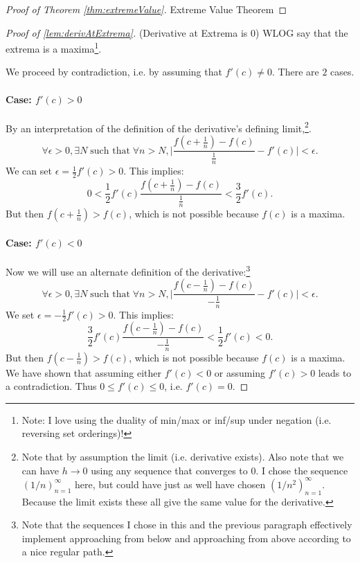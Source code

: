 \documentclass{article}[11pt]
\DeclareMathOperator{\st}{\text{ such that }}
\begin{document}
\begin{proof}[Proof of Theorem \ref{thm:extremeValue}]{Extreme Value Theorem}
\end{proof}

\begin{proof}[Proof of \ref{lem:derivAtExtrema}]{(Derivative at Extrema is 0)}
	WLOG say that the extrema is a maxima\footnote{Note: I love using the duality of min/max or inf/sup under negation (i.e. reversing set orderings)!}.

	We proceed by contradiction, i.e. by assuming that $f'(c) \neq 0$. There are $2$ cases.
	\paragraph{Case: $f'(c) > 0$}
	By an interpretation of the definition of the derivative's defining limit,\footnote{Note that by assumption the limit (i.e. derivative exists). Also note that we can have $h\to 0$ using any sequence that converges to $0$. I chose the sequence $(1/n)_{n=1}^{\infty}$ here, but could have just as well have chosen $(1/n^2)_{n=1}^{\infty}$. Because the limit exists these all give the same value for the derivative.}. 
	$$\forall \epsilon > 0, \exists N \st \forall n>N, \Big|\frac{f(c+\frac{1}{n}) - f(c)}{\frac{1}{n}} - f'(c)\Big| < \epsilon.$$
	We can set $\epsilon = \frac{1}{2}f'(c) > 0$. 
	This implies:
	$$0< \frac{1}{2}f'(c) \frac{f(c+\frac{1}{n}) - f(c)}{\frac{1}{n}} < \frac{3}{2} f'(c).$$
	But then $f(c+\frac{1}{n})> f(c)$, which is not possible because $f(c)$ is a maxima.
	\paragraph{Case: $f'(c) < 0$}
	Now we will use an alternate definition of the derivative:\footnote{Note that the sequences I chose in this and the previous paragraph effectively implement approaching from below and approaching from above according to a nice regular path.}
	$$\forall \epsilon > 0, \exists N \st \forall n>N, \Big|\frac{f(c-\frac{1}{n}) - f(c)}{-\frac{1}{n}} - f'(c)\Big| < \epsilon.$$
	We set $\epsilon = -\frac{1}{2}f'(c) > 0$. 
	This implies:
	$$\frac{3}{2}f'(c) \frac{f(c-\frac{1}{n}) - f(c)}{-\frac{1}{n}} < \frac{1}{2} f'(c) < 0.$$
	But then $f(c-\frac{1}{n}) > f(c)$, which is not possible because $f(c)$ is a maxima.\\
	
	We have shown that assuming either $f'(c) < 0$ or assuming $f'(c) > 0$ leads to a contradiction. Thus $0 \le f'(c) \le 0$, i.e. $f'(c) = 0$.
\end{proof}
\end{document}
